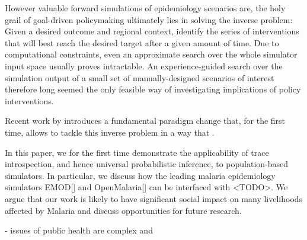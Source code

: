 \documentclass{article}
\begin{document}
However valuable forward simulations of epidemiology scenarios are, the holy grail of goal-driven policymaking ultimately lies in solving the inverse problem: Given a desired outcome and regional context, identify the series of interventions that will best reach the desired target after a given amount of time. Due to computational constraints, even an approximate search over the whole simulator input space usually proves intractable. An experience-guided search over the simulation output of a small set of manually-designed scenarios of interest therefore long seemed the only feasible way of investigating implications of policy interventions.

Recent work by \citep{Baydin} introduces a fundamental paradigm change that, for the first time, allows to tackle this inverse problem in a way that . 




In this paper, we for the first time demonstrate the applicability of trace introspection, and hence universal probabilistic inference, to population-based simulators. In particular, we discuss how the leading malaria epidemiology simulators EMOD[] and OpenMalaria[] can be interfaced with <TODO>. We argue that our work is likely to have significant social impact on many livelihoods affected by Malaria and discuss opportunities for future research.



- issues of public health are complex and 
\end{document}
